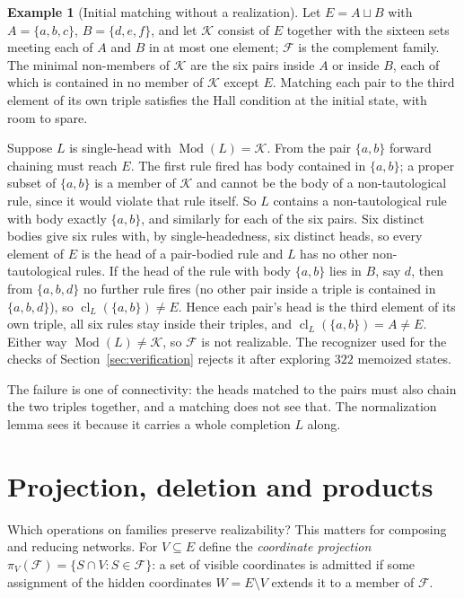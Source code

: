 \documentclass[11pt,a4paper]{article}
\theoremstyle{plain}
\theoremstyle{definition}
\newtheorem{example}[theorem]{Example}
\theoremstyle{remark}
\newcommand{\cF}{\mathcal F}
\newcommand{\cK}{\mathcal K}
\newcommand{\Mod}{\operatorname{Mod}}
\newcommand{\cl}{\operatorname{cl}}
\begin{document}
\begin{example}[Initial matching without a realization]\label{ex:sixhall}
Let $E=A\sqcup B$ with $A=\{a,b,c\}$, $B=\{d,e,f\}$, and let $\cK$ consist of $E$ together with the sixteen sets meeting each of $A$ and $B$ in at most one element; $\cF$ is the complement family. The minimal non-members of $\cK$ are the six pairs inside $A$ or inside $B$, each of which is contained in no member of $\cK$ except $E$. Matching each pair to the third element of its own triple satisfies the Hall condition at the initial state, with room to spare.

Suppose $L$ is single-head with $\Mod(L)=\cK$. From the pair $\{a,b\}$ forward chaining must reach $E$. The first rule fired has body contained in $\{a,b\}$; a proper subset of $\{a,b\}$ is a member of $\cK$ and cannot be the body of a non-tautological rule, since it would violate that rule itself. So $L$ contains a non-tautological rule with body exactly $\{a,b\}$, and similarly for each of the six pairs. Six distinct bodies give six rules with, by single-headedness, six distinct heads, so every element of $E$ is the head of a pair-bodied rule and $L$ has no other non-tautological rules. If the head of the rule with body $\{a,b\}$ lies in $B$, say $d$, then from $\{a,b,d\}$ no further rule fires (no other pair inside a triple is contained in $\{a,b,d\}$), so $\cl_L(\{a,b\})\neq E$. Hence each pair's head is the third element of its own triple, all six rules stay inside their triples, and $\cl_L(\{a,b\})=A\neq E$. Either way $\Mod(L)\neq\cK$, so $\cF$ is not realizable. The recognizer used for the checks of Section~\ref{sec:verification} rejects it after exploring $322$ memoized states.
\end{example}

The failure is one of connectivity: the heads matched to the pairs must also chain the two triples together, and a matching does not see that. The normalization lemma sees it because it carries a whole completion $L$ along.

\section{Projection, deletion and products}\label{sec:projection}

Which operations on families preserve realizability? This matters for composing and reducing networks. For $V\subseteq E$ define the \emph{coordinate projection} $\pi_V(\cF)=\{S\cap V:S\in\cF\}$: a set of visible coordinates is admitted if some assignment of the hidden coordinates $W=E\setminus V$ extends it to a member of $\cF$.
\end{document}

